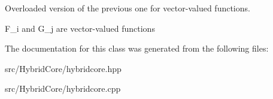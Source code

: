 Overloaded version of the previous one for vector-\/valued functions. 

F\+\_\+i and G\+\_\+j are vector-\/valued functions 

The documentation for this class was generated from the following files\+:\begin{DoxyCompactItemize}
\item 
src/\+Hybrid\+Core/hybridcore.\+hpp\item 
src/\+Hybrid\+Core/hybridcore.\+cpp\end{DoxyCompactItemize}
